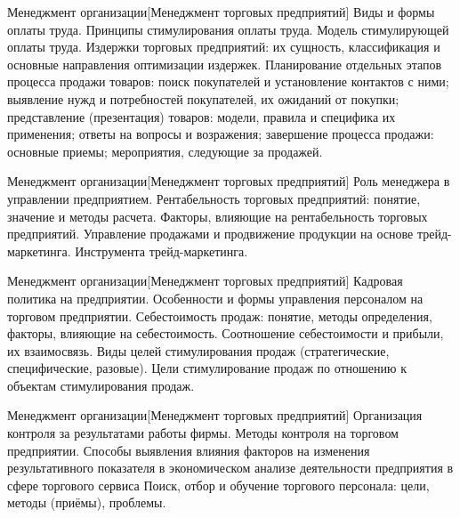 \documentclass[
	11pt,
	a4paper,
	]
	{article}
\begin{document}
\begin{minipage}[t][\miniH]{\miniL}\centering
	 {Менеджмент организации}[Менеджмент торговых предприятий]
		{
			Виды и формы оплаты труда. Принципы стимулирования оплаты труда. Модель стимулирующей оплаты труда.
		}{
			Издержки торговых предприятий: их сущность, классификация и основные направления оптимизации издержек.
		}{
			Планирование отдельных этапов процесса продажи товаров: поиск покупателей и установление контактов с ними; выявление нужд и потребностей покупателей, их ожиданий от покупки; представление (презентация) товаров: модели, правила и специфика их применения; ответы на вопросы и возражения; завершение процесса продажи: основные приемы; мероприятия, следующие за продажей.
		}
	\lowGE
\end{minipage}

\vfill



\begin{minipage}[t][\miniH]{\miniL}\centering
	 {Менеджмент организации}[Менеджмент торговых предприятий]
		{
			Роль менеджера в управлении предприятием.
		}{
			Рентабельность торговых предприятий: понятие, значение и методы расчета. Факторы, влияющие на рентабельность торговых предприятий.
		}{
			Управление продажами и продвижение продукции на основе трейд-маркетинга. Инструмента трейд-маркетинга.
		}
	\lowGE
\end{minipage}

\vfill



\begin{minipage}[t][\miniH]{\miniL}\centering
	 {Менеджмент организации}[Менеджмент торговых предприятий]
		{
			Кадровая политика на предприятии. Особенности и формы управления персоналом на торговом предприятии.
		}{
			Себестоимость продаж: понятие, методы определения, факторы, влияющие на себестоимость. Соотношение себестоимости и прибыли, их взаимосвязь.
		}{
			Виды целей стимулирования продаж (стратегические, специфические, разовые). Цели стимулирование продаж по отношению к объектам стимулирования продаж.
		}
	\lowGE
\end{minipage}





\begin{minipage}[t][\miniH]{\miniL}\centering
	 {Менеджмент организации}[Менеджмент торговых предприятий]
		{
			Организация контроля за результатами работы фирмы. Методы контроля на торговом предприятии.
		}{
			Способы выявления влияния факторов на изменения результативного показателя в экономическом анализе деятельности предприятия в сфере торгового сервиса
		}{
			Поиск, отбор и обучение торгового персонала: цели, методы (приёмы), проблемы.
		}
	\lowGE
\end{minipage}
\end{document}
